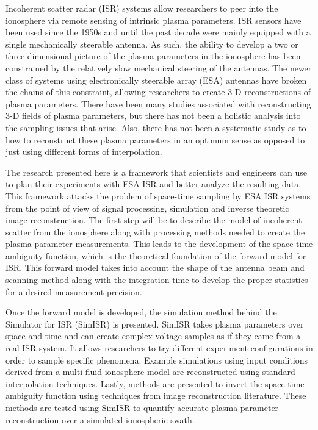
Incoherent scatter radar (ISR) systems allow researchers to peer into the ionosphere via remote sensing of intrinsic plasma parameters. ISR sensors have been used since the 1950s and until the past decade were mainly equipped with a single mechanically steerable antenna. As such, the ability to develop a two or three dimensional picture of the plasma parameters in the ionosphere has been constrained by the relatively slow mechanical steering of the antennas. The newer class of systems using electronically steerable array (ESA) antennas have broken the chains of this constraint, allowing researchers to create 3-D reconstructions of plasma parameters. There have been many studies associated with reconstructing 3-D fields of plasma parameters, but there has not been a holistic analysis into the sampling issues that arise. Also, there has not been a systematic study as to how to reconstruct these plasma parameters in an optimum sense as opposed to just using different forms of interpolation.

The research presented here is a framework that scientists and engineers can use to plan their experiments with ESA ISR and better analyze the resulting data. This framework attacks the problem of space-time sampling by ESA ISR systems from the point of view of signal processing, simulation and inverse theoretic image reconstruction. The first step will be to describe the model of incoherent scatter from the ionosphere along with processing methods needed to create the plasma parameter measurements. This leads to the development of the space-time ambiguity function, which is the theoretical foundation of the forward model for ISR. This forward model takes into account the shape of the antenna beam and scanning method along with the integration time to develop the proper statistics for a desired measurement precision.

Once the forward model is developed, the simulation method behind the Simulator for ISR (SimISR) is presented. SimISR takes plasma parameters over space and time and can create complex voltage samples as if they came from a real ISR system. It allows researchers to try different experiment configurations in order to sample specific phenomena. Example simulations using input conditions derived from a multi-fluid ionosphere model are reconstructed using standard interpolation techniques. Lastly, methods are presented to invert the space-time ambiguity function using techniques from image reconstruction literature. These methods are tested using SimISR to quantify accurate plasma parameter reconstruction over a simulated ionospheric swath.

